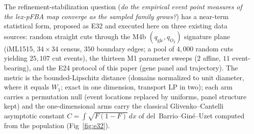 \documentclass[11pt,a4paper]{article}
\theoremstyle{plain}
\theoremstyle{definition}
\theoremstyle{remark}
\begin{document}
The refinement-stabilization question
(\emph{do the empirical event point measures of the
lex-pFBA map converge as the sampled family grows?}) has a
near-term statistical form, proposed as E32 and executed here on
three existing data sources: random straight cuts through the M4b
$(q_{\mathrm{glc}}, q_{O_2})$ signature plane (iML1515, $34\times34$
census, $350$ boundary edges; a pool of $4{,}000$ random cuts
yielding $25{,}107$ cut events), the thirteen M1 parameter sweeps
($2$ affine, $11$ event-bearing), and the E24 protocol of this paper
(gene panel and trajectory). The metric is the bounded-Lipschitz
distance (domains normalized to unit diameter, where it equals
$W_1$; exact in one dimension, transport LP in two); each arm carries
a permutation null (event locations replaced by uniforms, panel
structure kept) and the one-dimensional arms carry the classical
Glivenko--Cantelli asymptotic constant
$C = \int\sqrt{F(1-F)}\,dx$ of del~Barrio--Gin\'e--Uzet computed from
the population (Fig~\ref{fig:e32}).
\end{document}
